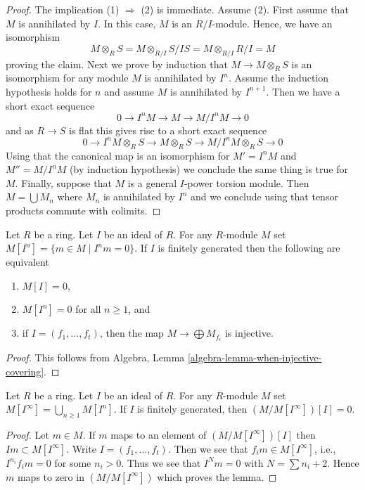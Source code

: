 \begin{proof}
The implication (1) $\Rightarrow$ (2) is immediate.
Assume (2). First assume that $M$ is annihilated by $I$.
In this case, $M$ is an $R/I$-module. Hence, we have an isomorphism  
$$
M \otimes_R S = M \otimes_{R/I} S/IS = M \otimes_{R/I} R/I = M
$$
proving the claim. Next we prove by induction that $M \to M \otimes_R S$
is an isomorphism for any module $M$ is annihilated by $I^n$. Assume
the induction hypothesis holds for $n$ and assume $M$ is annihilated by
$I^{n + 1}$. Then we have a short exact sequence
$$
0 \to I^nM \to M \to M/I^nM \to 0
$$
and as $R \to S$ is flat this gives rise to a short exact sequence
$$
0 \to I^nM \otimes_R S \to M \otimes_R S \to M/I^nM \otimes_R S \to 0
$$
Using that the canonical map is an isomorphism for $M' = I^nM$ and
$M'' = M/I^nM$ (by induction hypothesis) we conclude the same thing is
true for $M$. Finally, suppose that $M$ is a general $I$-power torsion
module. Then $M = \bigcup M_n$ where $M_n$ is annihilated by $I^n$
and we conclude using that tensor products commute with colimits.
\end{proof}

\begin{lemma}
\label{lemma-torsion-free}
Let $R$ be a ring. Let $I$ be an ideal of $R$.
For any $R$-module $M$ set $M[I^n] = \{m \in M \mid I^nm = 0\}$.
If $I$ is finitely generated then the following are equivalent
\begin{enumerate}
\item $M[I] = 0$,
\item $M[I^n] = 0$ for all $n \geq 1$, and
\item if $I = (f_1, \ldots, f_t)$, then the map
$M \to \bigoplus M_{f_i}$ is injective.
\end{enumerate}
\end{lemma}

\begin{proof}
This follows from
Algebra, Lemma \ref{algebra-lemma-when-injective-covering}.
\end{proof}

\begin{lemma}
\label{lemma-divide-by-torsion}
Let $R$ be a ring. Let $I$ be an ideal of $R$. For any $R$-module $M$
set $M[I^\infty] = \bigcup_{n \geq 1} M[I^n]$.
If $I$ is finitely generated, then $(M/M[I^\infty])[I] = 0$.
\end{lemma}

\begin{proof}
Let $m \in M$. If $m$ maps to an element of $(M/M[I^\infty])[I]$
then $Im \subset M[I^\infty]$.
Write $I = (f_1, \ldots, f_t)$. Then we see that
$f_i m \in M[I^\infty]$, i.e., $I^{n_i}f_i m = 0$ for some $n_i > 0$.
Thus we see that $I^Nm = 0$ with $N = \sum n_i + 2$.
Hence $m$ maps to zero in $(M/M[I^\infty])$ which proves the lemma.
\end{proof}

